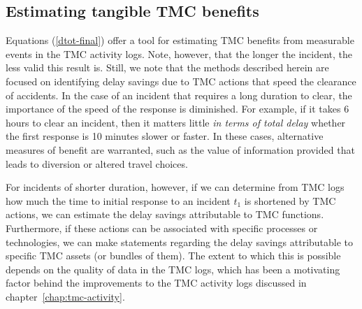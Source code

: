 \documentclass[12pt]{report}
\renewcommand{\fixme}[3][]{#1\xspace}
\newcounter{time}
\newcounter{space}
\begin{document}
\subsection{Estimating tangible TMC benefits}
\label{sec:est-benefits}

Equations (\ref{dtot-final}) offer a tool for estimating \ac{TMC}
benefits from measurable events in the \ac{TMC} activity logs.  Note,
however, that the longer the incident, the less valid this result is.
Still, we note that the methods described herein are focused on
identifying delay savings due to TMC actions that speed the clearance
of accidents.  In the case of an incident that requires a long
duration to clear, the importance of the speed of the response is
diminished.  For example, if it takes 6 hours to clear an incident,
then it matters little \emph{in terms of total delay} whether the
first response is 10 minutes slower or faster.  In these cases,
alternative measures of benefit are warranted, such as the value of
information provided that leads to diversion or altered travel
choices.

For incidents of shorter duration, however, if we can determine from
\ac{TMC} logs how much the time to initial response to an incident
$t_1$ is shortened by \ac{TMC} actions, we can estimate the delay
savings attributable to \ac{TMC} functions.  Furthermore, if these
actions can be associated with specific processes or technologies, we
can make statements regarding the delay savings attributable to
specific \ac{TMC} assets (or bundles of them). The extent to which
this is possible depends on the quality of data in the \ac{TMC} logs,
which has been a motivating factor behind the improvements to the
\ac{TMC} activity logs discussed in chapter~\ref{chap:tmc-activity}.



\end{document}
